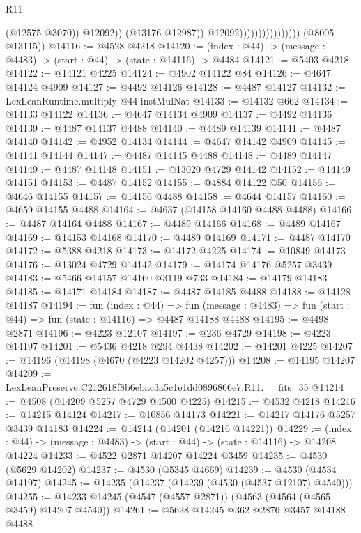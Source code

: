 \begin{lexlean}{R11}
\begin{coremodule}
                                              (@12575 @3070))
                                            @12092))
                                        (@13176 @12987))
                                      @12092))))))))))))))))
      (@8005 @13115))
@14116 := @4528 @4218
@14120 := (index : @44) -> (message : @4483) -> (start : @44) -> (state : @14116) -> @4484
@14121 := @5403 @4218
@14122 := @14121 @4225
@14124 := @4902 @14122 @84
@14126 := @4647 @14124 @4909
@14127 := @4492 @14126
@14128 := @4487 @14127
@14132 := LexLeanRuntime.multiply @44 instMulNat
@14133 := @14132 @662
@14134 := @14133 @14122
@14136 := @4647 @14134 @4909
@14137 := @4492 @14136
@14139 := @4487 @14137 @4488
@14140 := @4489 @14139
@14141 := @4487 @14140
@14142 := @4952 @14134
@14144 := @4647 @14142 @4909
@14145 := @14141 @14144
@14147 := @4487 @14145 @4488
@14148 := @4489 @14147
@14149 := @4487 @14148
@14151 := @13020 @4729 @14142
@14152 := @14149 @14151
@14153 := @4487 @14152
@14155 := @4884 @14122 @50
@14156 := @4646 @14155
@14157 := @14156 @4488
@14158 := @4644 @14157
@14160 := @4659 @14155 @4488
@14164 := @4637 (@14158 @14160 @4488 @4488)
@14166 := @4487 @14164 @4488
@14167 := @4489 @14166
@14168 := @4489 @14167
@14169 := @14153 @14168
@14170 := @4489 @14169
@14171 := @4487 @14170
@14172 := @5388 @4218
@14173 := @14172 @4225
@14174 := @10849 @14173
@14176 := @13024 @4729 @14142
@14179 := @14174 @14176 @5257 @3439
@14183 := @5466 @14157 @14160 @3119 @733
@14184 := @14179 @14183
@14185 := @14171 @14184
@14187 := @4487 @14185 @4488
@14188 := @14128 @14187
@14194 := fun (index : @44) =>
  fun (message : @4483) => fun (start : @44) => fun (state : @14116) => @4487 @14188 @4488
@14195 := @4498 @2871
@14196 := @4223 @12107
@14197 := @236 @4729
@14198 := @4223 @14197
@14201 := @5436 @4218 @294 @4438
@14202 := @14201 @4225
@14207 := @14196 (@14198 (@4670 (@4223 @14202 @4257)))
@14208 := @14195 @14207
@14209 := LexLeanPreserve.C212618f8b6ebac3a5c1e1dd0896866e7.R11.__fits_35
@14214 := @4508 (@14209 @5257 @4729 @4500 @4225)
@14215 := @4532 @4218
@14216 := @14215 @14124
@14217 := @10856 @14173
@14221 := @14217 @14176 @5257 @3439 @14183
@14224 := @14214 (@14201 (@14216 @14221))
@14229 := (index : @44) -> (message : @4483) -> (start : @44) -> (state : @14116) -> @14208 @14224
@14233 := @4522 @2871 @14207 @14224 @3459
@14235 := @4530 (@5629 @14202)
@14237 := @4530 (@5345 @4669)
@14239 := @4530 (@4534 @14197)
@14245 := @14235 (@14237 (@14239 (@4530 (@4537 @12107) @4540)))
@14255 := @14233 @14245 (@4547 (@4557 @2871)) (@4563 (@4564 (@4565 @3459) @14207 @4540))
@14261 := @5628 @14245 @362 @2876 @3457 @14188 @4488

\end{coremodule}
\end{lexlean}
